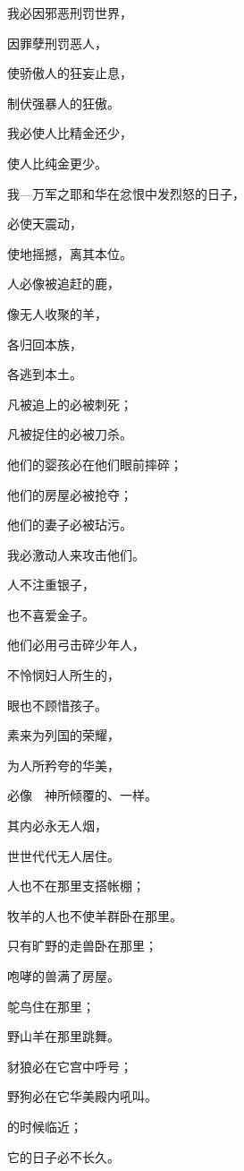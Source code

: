 {\par }{\Q {}我必因邪恶刑罚世界，
\par }{\Q 因罪孽刑罚恶人，
\par }{\Q 使骄傲人的狂妄止息，
\par }{\Q 制伏强暴人的狂傲。
\par }{\Q {}我必使人比精金还少，
\par }{\Q 使人比{}纯金更少。
\par }{\Q {}我—万军之耶和华在忿恨中发烈怒的日子，
\par }{\Q 必使天震动，
\par }{\Q 使地摇撼，离其本位。
\par }{\Q {}人必像被追赶的鹿，
\par }{\Q 像无人收聚的羊，
\par }{\Q 各归回本族，
\par }{\Q 各逃到本土。
\par }{\Q {}凡被{}追上的必被刺死；
\par }{\Q 凡被捉住的必被刀杀。
\par }{\Q {}他们的婴孩必在他们眼前摔碎；
\par }{\Q 他们的房屋必被抢夺；
\par }{\Q 他们的妻子必被玷污。
\par }{\BB \par }{\Q {}我必激动{}人来攻击他们。
\par }{人不注重银子，
\par }{\Q 也不喜爱金子。
\par }{\Q {}他们必用弓击碎少年人，
\par }{\Q 不怜悯妇人所生的，
\par }{\Q 眼也不顾惜孩子。
\par }{\Q {}素来为列国的荣耀，
\par }{\Q 为{}人所矜夸的华美，
\par }{\Q 必像　神所倾覆的{}、{}一样。
\par }{\Q {}其内必永无人烟，
\par }{\Q 世世代代无人居住。
\par }{人也不在那里支搭帐棚；
\par }{\Q 牧羊的人也不使羊群卧在那里。
\par }{\Q {}只有旷野的走兽卧在那里；
\par }{\Q 咆哮的兽满了房屋。
\par }{\Q 鸵鸟住在那里；
\par }{\Q 野山羊在那里跳舞。
\par }{\Q {}豺狼必在它宫中呼号；
\par }{\Q 野狗必在它华美殿内吼叫。
\par }{的时候临近；
\par }{\Q 它的日子必不长久。

}
